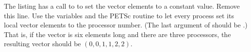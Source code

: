   The listing has a call to  to set the vector elements to a
  constant value. Remove this line.
  Use the  variables and the PETSc routine
   to let every process set its
  local vector elements to the processor number. (The last argument of
   should be .) That is, if the
  vector is six elements long and there are three processors, the
  resulting vector should be $(0,0,1,1,2,2)$.
